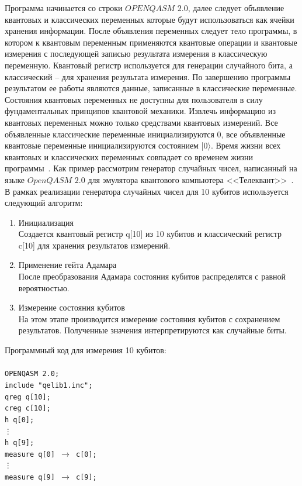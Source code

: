 \documentclass[12pt,a4paper]{article}
\begin{document}
	Программа начинается со строки $OPENQASM$ $2.0$, далее следует объявление квантовых и классических переменных которые будут использоваться как ячейки хранения информации. После объявления переменных следует тело программы, в котором к квантовым переменным применяются квантовые операции и квантовые измерения с последующей записью результата измерения в классическую переменную. Квантовый регистр используется для генерации случайного бита, а классический -- для хранения результата измерения. По завершению программы результатом ее работы являются данные, записанные в классические переменные. Состояния квантовых переменных не доступны для пользователя в силу фундаментальных принципов квантовой механики. Извлечь информацию из квантовых переменных можно только средствами квантовых измерений. Все объявленные классические переменные инициализируются $0$, все объявленные квантовые переменные инициализируются состоянием |0$\rangle$. Время жизни всех квантовых и классических переменных совпадает со временем жизни программы~\cite{Telequant}.
	Как пример рассмотрим генератор случайных чисел, написанный на языке $ OpenQASM$ $2.0$ для эмулятора квантового компьютера <<Телеквант>>~\cite{Telequant}. В рамках реализации генератора случайных чисел для 10 кубитов используется следующий алгоритм:
	\begin{enumerate}
		\item Инициализация \\
		Создается квантовый регистр q[10] из 10 кубитов и классический регистр c[10] для хранения результатов измерений.
		\item Применение гейта Адамара \\
		После преобразования Адамара состояния кубитов распределятся с равной вероятностью.
		\item Измерение состояния кубитов \\
		На этом этапе производится измерение состояния кубитов с сохранением результатов. Полученные значения интерпретируются как случайные биты.
	\end{enumerate}
	Программный код для измерения 10 кубитов: \\\\
	\texttt{OPENQASM 2.0;\\
		include "qelib1.inc";\\
		qreg q[10];\\
		creg c[10];\\
		h q[0];\\
		\vdots \\
		h q[9];\\
		measure q[0] $\rightarrow$ c[0];\\
		\vdots \\
		measure q[9] $\rightarrow$ c[9];\\}
	
\end{document}
